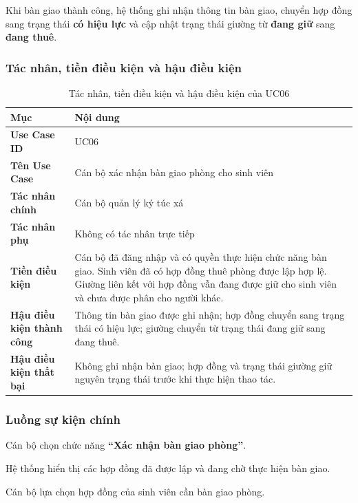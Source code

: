 Khi bàn giao thành công, hệ thống ghi nhận thông tin bàn giao, chuyển hợp đồng sang trạng thái \textbf{có hiệu lực} và cập nhật trạng thái giường từ \textbf{đang giữ} sang \textbf{đang thuê}.

\subsubsection{Tác nhân, tiền điều kiện và hậu điều kiện}

\begin{table}[H]
\centering
\small
\caption{Tác nhân, tiền điều kiện và hậu điều kiện của UC06}
\label{tab:ch2-10}
\begin{tabularx}{\textwidth}{|>{\raggedright\arraybackslash}p{}|>{\raggedright\arraybackslash}X|}
\hline
\textbf{Mục} & \textbf{Nội dung} \\
\hline
\textbf{Use Case ID} & UC06 \\
\hline
\textbf{Tên Use Case} & Cán bộ xác nhận bàn giao phòng cho sinh viên \\
\hline
\textbf{Tác nhân chính} & Cán bộ quản lý ký túc xá \\
\hline
\textbf{Tác nhân phụ} & Không có tác nhân trực tiếp \\
\hline
\textbf{Tiền điều kiện} & Cán bộ đã đăng nhập và có quyền thực hiện chức năng bàn giao. Sinh viên đã có hợp đồng thuê phòng được lập hợp lệ. Giường liên kết với hợp đồng vẫn đang được giữ cho sinh viên và chưa được phân cho người khác. \\
\hline
\textbf{Hậu điều kiện thành công} & Thông tin bàn giao được ghi nhận; hợp đồng chuyển sang trạng thái có hiệu lực; giường chuyển từ trạng thái đang giữ sang đang thuê. \\
\hline
\textbf{Hậu điều kiện thất bại} & Không ghi nhận bàn giao; hợp đồng và trạng thái giường giữ nguyên trạng thái trước khi thực hiện thao tác. \\
\hline
\end{tabularx}
\end{table}

\subsubsection{Luồng sự kiện chính}

Cán bộ chọn chức năng \textbf{“Xác nhận bàn giao phòng”}.

Hệ thống hiển thị các hợp đồng đã được lập và đang chờ thực hiện bàn giao.

Cán bộ lựa chọn hợp đồng của sinh viên cần bàn giao phòng.

